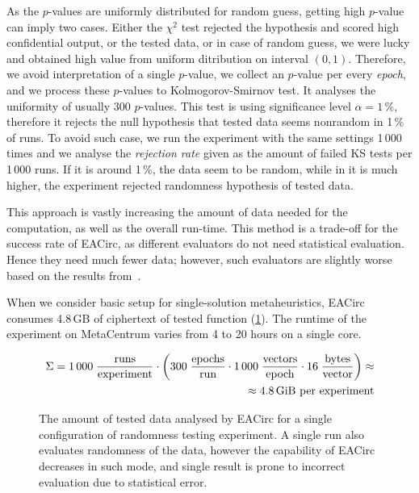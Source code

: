 \documentclass[
  print, %
  Table,   %
  nolof,     %
  nolot,     %
  11pt, %
  oneside  %
]{fithesis3}
\begin{document}
As the $p$-values are uniformly distributed for random guess, getting high $p$-value can imply two cases. Either the $\chi^{2}$ test rejected the hypothesis and scored high confidential output, or the tested data, or in case of random guess, we were lucky and obtained high value from uniform ditribution on interval $(0, 1)$. Therefore, we avoid interpretation of a single $p$-value, we collect an $p$-value per every \textit{epoch}, and we process these $p$-values to Kolmogorov-Smirnov test. It analyses the uniformity of usually 300 $p$-values. This test is using significance level $\alpha = 1\,\%$, therefore it rejects the null hypothesis that tested data seems nonrandom in 1\,\% of runs. To avoid such case, we run the experiment with the same settings 1\,000 times and we analyse the \textit{rejection rate} given as the amount of failed KS tests per 1\,000 runs. If it is around 1\,\%, the data seem to be random, while in it is much higher, the experiment rejected randomness hypothesis of tested data.

This approach is vastly increasing the amount of data needed for the computation, as well as the overall run-time. This method is a trade-off for the success rate of EACirc, as different evaluators do not need statistical evaluation. Hence they need much fewer data; however, such evaluators are slightly worse based on the results from~\cite{svenda2013towards}.

When we consider basic setup for single-solution metaheuristics, EACirc consumes 4.8\,GB of ciphertext of tested function (\cref{fig:dataUsage}). The runtime of the experiment on MetaCentrum varies from 4 to 20 hours on a single core.

\begin{figure}[t]
    \begin{equation*}
        \begin{aligned}
    \Sigma = 1\,000 \;
             \frac{\textnormal{runs}}
                  {\textnormal{experiment}}
             \cdot
             \left(
             300 \;
             \frac{\textnormal{epochs}}
                  {\textnormal{run}}
             \cdot
             1\,000 \;
             \frac{\textnormal{vectors}}
                  {\textnormal{epoch}}
             \cdot
             16 \;
             \frac{\textnormal{bytes}}
                  {\textnormal{vector}}
             \right) \approx\\
             \approx 4.8 \textnormal{\,GiB per experiment}
        \end{aligned}
    \end{equation*}
    \caption{The amount of tested data analysed by EACirc for a single configuration of randomness testing experiment. A single run also evaluates randomness of the data, however the capability of EACirc decreases in such mode, and single result is prone to incorrect evaluation due to statistical error.}
    \label{fig:dataUsage}
\end{figure}
\end{document}
